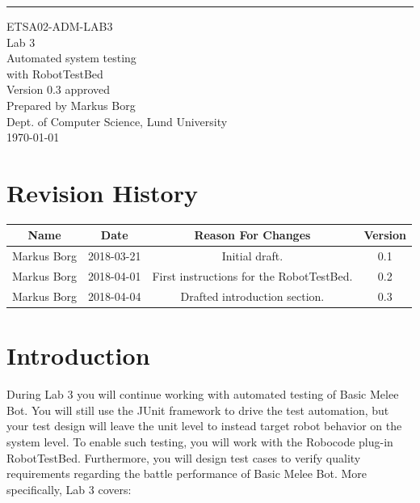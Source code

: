 \documentclass{scrreprt}
\date{}
\def\myversion{0.3 }
\begin{document}
\begin{flushright}
    \rule{16cm}{5pt}\vskip1cm
    \begin{bfseries}
    	\LARGE{ETSA02-ADM-LAB3}\\
    	\vspace{1.5cm}
        \Huge{Lab 3}\\
        \vspace{0.5cm}
        Automated system testing\\
        \vspace{0.5cm}
        with RobotTestBed\\
        \vspace{1.5cm}
        \LARGE{Version \myversion approved}\\
        \vspace{1.5cm}
        Prepared by Markus Borg\\
        Dept. of Computer Science, Lund University\\
        \vspace{1.5cm}
        \today\\
    \end{bfseries}
\end{flushright}


\chapter*{Revision History}

\begin{center}
    \begin{tabular}{|c|c|c|c|}
        \hline
	    Name & Date & Reason For Changes & Version\\
        \hline
	    Markus Borg & 2018-03-21 & Initial draft. & 0.1\\
        \hline
        Markus Borg & 2018-04-01 & First instructions for the RobotTestBed. & 0.2\\
        \hline
        Markus Borg & 2018-04-04 & Drafted introduction section. & 0.3\\
        \hline
    \end{tabular}
\end{center}

\chapter{Introduction}
During Lab 3 you will continue working with automated testing of Basic Melee Bot. You will still use the JUnit framework to drive the test automation, but your test design will leave the unit level to instead target robot behavior on the system level. To enable such testing, you will work with the Robocode plug-in RobotTestBed. Furthermore, you will design test cases to verify quality requirements regarding the battle performance of Basic Melee Bot. More specifically, Lab 3 covers:
\end{document}
